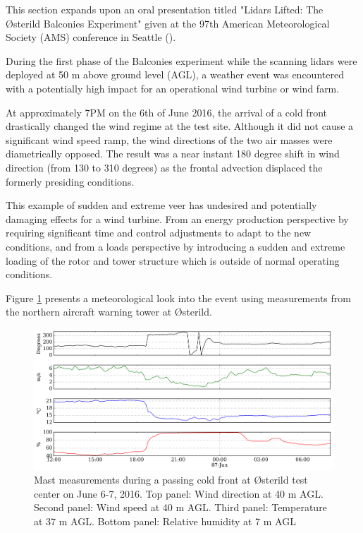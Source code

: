 This section expands upon an oral presentation titled "Lidars Lifted: The {\O}sterild Balconies Experiment" given at the 97th American Meteorological Society (AMS) conference in Seattle (\cite{simon_lidars_lifted_2017}).

During the first phase of the Balconies experiment while the scanning lidars were deployed at 50 m above ground level (AGL),
a weather event was encountered with a potentially high impact for an operational wind turbine or wind farm.

At approximately 7PM on the 6th of June 2016, the arrival of a cold front drastically changed the wind regime at the test site. Although it did not cause a significant wind speed ramp, the wind directions of the two air masses were diametrically opposed. The result was a near instant 180 degree shift in wind direction (from 130 to 310 degrees) as the frontal advection displaced the formerly presiding conditions. 

This example of sudden and extreme veer has undesired and potentially damaging effects for a wind turbine. From an energy production perspective by requiring significant time and control adjustments to adapt to the new conditions, and from a loads perspective by introducing a sudden and extreme loading of the rotor and tower structure which is outside of normal operating conditions.

Figure \ref{fig:balcony-front-mast} presents a meteorological look into the event using measurements from the northern aircraft warning tower at {\O}sterild.

\begin{figure}[htbp]
    \centering
        \includegraphics[width=1.0\textwidth]{graphics/results/balcony-addendum/balcony-front-mast.png}
    \caption{Mast measurements during a passing cold front at {\O}sterild test center on June 6-7, 2016.
    Top panel: Wind direction at 40 m AGL. Second panel: Wind speed at 40 m AGL. Third panel: Temperature at 37 m AGL. Bottom panel: Relative humidity at 7 m AGL}
    \label{fig:balcony-front-mast}
\end{figure}

